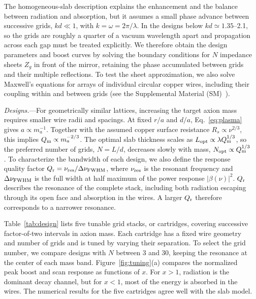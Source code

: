\documentclass[
  aps,prl,reprint,superscriptaddress,
  amsmath,amssymb,floatfix,nofootinbib
]{revtex4-2}
\newcommand{\Qm}{Q_{\rm m}}
\newcommand{\Qr}{Q_{\rm r}}
\begin{document}
The homogeneous-slab description explains the enhancement and the balance between radiation and absorption, but it assumes a small phase advance between successive grids, $kd\ll1$, with $k=\omega=2\pi/\lambda$. In the designs below $kd\simeq1.35$--2.1, so the grids are roughly a quarter of a vacuum wavelength apart and propagation across each gap must be treated explicitly. We therefore obtain the design parameters and boost curves by solving the boundary conditions for $N$ impedance sheets $Z_g$ in front of the mirror, retaining the phase accumulated between grids and their multiple reflections. To test the sheet approximation, we also solve Maxwell's equations for arrays of individual circular copper wires, including their coupling within and between grids (see the Supplemental Material (SM)~\cite{SM}).

\textit{Designs.}---For geometrically similar lattices, increasing the target axion mass requires smaller wire radii and spacings. At fixed $r/a$ and $d/a$, Eq.~\eqref{eq:plasma} gives $a\propto m_a^{-1}$. Together with the assumed copper surface resistance $R_s\propto\nu^{2/3}$, this implies $\Qm\propto m_a^{-2/3}$. The optimal slab thickness scales as $L_{\rm opt}\propto\lambda\Qm^{1/3}$, so the preferred number of grids, $N=L/d$, decreases slowly with mass, $N_{\rm opt}\propto\Qm^{1/3}$. %
To characterize the bandwidth of each design, we also define the response quality factor $\Qr=\nu_{\rm res}/\Delta\nu_{\rm FWHM}$, where $\nu_{\rm res}$ is the resonant frequency and $\Delta\nu_{\rm FWHM}$ is the full width at half maximum of the power response $|\beta(\nu)|^2$. $\Qr$ describes the resonance of the complete stack, including both radiation escaping through its open face and absorption in the wires. A larger $\Qr$ therefore corresponds to a narrower resonance. 

Table~\ref{tab:design} lists five tunable grid stacks, or cartridges, covering successive factor-of-two intervals in axion mass. Each cartridge has a fixed wire geometry and number of grids and is tuned by varying their separation. To select the grid number, we compare designs with $N$ between 3 and 30, keeping the resonance at the center of each mass band. Figure~\ref{fig:tuning}(a) compares the normalized peak boost and scan response as functions of $x$. For $x>1$, radiation is the dominant decay channel, but for $x<1$, most of the energy is absorbed in the wires. %
The numerical results for the five cartridges agree well with the slab model.
\end{document}
